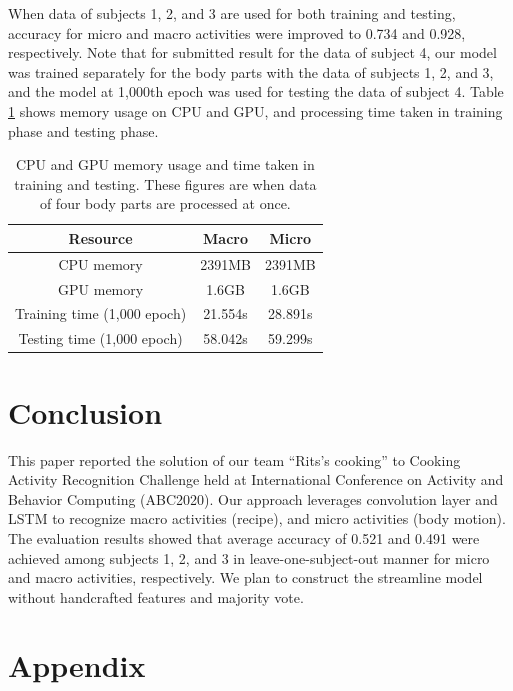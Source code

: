 \documentclass{svmult}
\begin{document}
When data of subjects 1, 2, and 3 are used for both training and testing, accuracy for micro and macro activities were improved to 0.734 and 0.928, respectively. 
Note that for submitted result for the data of subject 4, our model was trained separately for the body parts with the data of subjects 1, 2, and 3, and the model at 1,000th epoch was used for testing the data of subject 4.
Table \ref{tab:resources} shows memory usage on CPU and GPU, and processing time taken in training phase and testing phase.

\begin{table}[!h]
    \caption{CPU and GPU memory usage and time taken in training and testing. These figures are when data of four body parts are processed at once.}
    \centering
    \begin{tabular}{c|c|c}\hline\hline
         Resource& Macro & Micro  \\\hline
         CPU memory& 2391MB &2391MB\\
         GPU memory& 1.6GB& 1.6GB\\
         Training time (1,000 epoch)& 21.554s & 28.891s \\
         Testing time (1,000 epoch)& 58.042s & 59.299s \\\hline
    \end{tabular}
    \label{tab:resources}
\end{table}


\section{Conclusion}
\label{sec:conclusion}
This paper reported the solution of our team ``Rits's cooking'' to Cooking Activity Recognition Challenge held at International Conference on Activity and Behavior Computing (ABC2020). 
Our approach leverages convolution layer and LSTM to recognize macro activities (recipe), and micro activities (body motion). The evaluation results showed that average accuracy of 0.521 and 0.491 were achieved among subjects 1, 2, and 3 in leave-one-subject-out manner for micro and macro activities, respectively. We plan to construct the streamline model without handcrafted features and majority vote.




\section*{Appendix}
\end{document}
